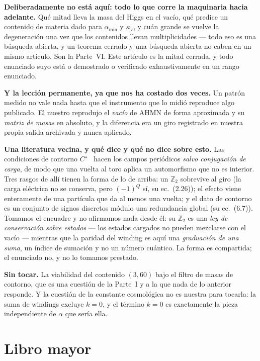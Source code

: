 \documentclass[11pt,a4paper]{article}
\newcommand{\ZZ}{\mathbb{Z}}
\begin{document}
\textbf{Deliberadamente no está aquí: todo lo que corre la maquinaria hacia adelante.} Qué mitad
lleva la masa del Higgs en el vacío, qué predice un contenido de materia dado para $\alpha_{\min}$ y
$\kappa_V$, y cuán grande se vuelve la degeneración una vez que los contenidos llevan
multiplicidades --- todo eso es una búsqueda abierta, y un teorema cerrado y una búsqueda abierta no
caben en un mismo artículo. Son la Parte~VI. Este artículo es la mitad cerrada, y todo enunciado suyo
está o demostrado o verificado exhaustivamente en un rango enunciado.

\textbf{Y la lección permanente, ya que nos ha costado dos veces.} Un patrón medido no vale nada
hasta que el instrumento que lo midió reproduce algo publicado. El nuestro reprodujo el \emph{vacío}
de AHMN de forma aproximada y su \emph{matriz de masas} en absoluto, y la diferencia era un giro
registrado en nuestra propia salida archivada y nunca aplicado.

\textbf{Una literatura vecina, y qué dice y qué no dice sobre esto.} Las condiciones de contorno
$C^\star$~\cite{Cstar} hacen los campos periódicos \emph{salvo conjugación de carga}, de modo que una
vuelta al toro aplica un automorfismo que no es interior. Tres rasgos de allí tienen la forma de lo
de arriba: un $\ZZ_2$ sobrevive al giro (la carga eléctrica no se conserva, pero $(-1)^Q$ sí, su
ec.~(2.26)); el efecto viene enteramente de una partícula que da al menos una vuelta; y el dato de
contorno es un conjunto de signos discretos módulo una redundancia global (su ec.~(6.7)). Tomamos el
encuadre y no afirmamos nada desde él: su $\ZZ_2$ es una \emph{ley de conservación sobre estados}
--- los estados cargados no pueden mezclarse con el vacío --- mientras que la paridad del winding es
aquí una \emph{graduación de una suma}, un índice de sumación y no un número cuántico. La forma es
compartida; el enunciado no, y no lo tomamos prestado.

\textbf{Sin tocar.} La viabilidad del contenido $(3,60)$ bajo el filtro de masas de contorno, que es
una cuestión de la Parte~I y a la que nada de lo anterior responde. Y la cuestión de la constante
cosmológica no es nuestra para tocarla: la suma de windings excluye $k=0$, y el término $k=0$ es
exactamente la pieza independiente de $\alpha$ que sería ella.

\section{Libro mayor}\label{sec:ledger}
\end{document}
